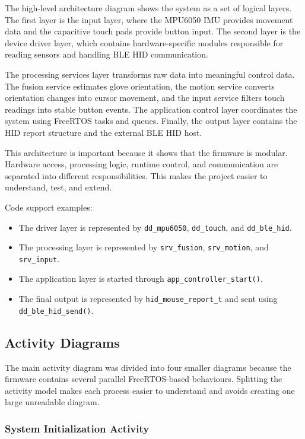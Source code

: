 The high-level architecture diagram shows the system as a set of logical layers. The first layer is the input layer, where the MPU6050 IMU provides movement data and the capacitive touch pads provide button input. The second layer is the device driver layer, which contains hardware-specific modules responsible for reading sensors and handling BLE HID communication.

The processing services layer transforms raw data into meaningful control data. The fusion service estimates glove orientation, the motion service converts orientation changes into cursor movement, and the input service filters touch readings into stable button events. The application control layer coordinates the system using FreeRTOS tasks and queues. Finally, the output layer contains the HID report structure and the external BLE HID host.

This architecture is important because it shows that the firmware is modular. Hardware access, processing logic, runtime control, and communication are separated into different responsibilities. This makes the project easier to understand, test, and extend.

Code support examples:
\begin{itemize}
    \item The driver layer is represented by \texttt{dd\_mpu6050}, \texttt{dd\_touch}, and \texttt{dd\_ble\_hid}.
    \item The processing layer is represented by \texttt{srv\_fusion}, \texttt{srv\_motion}, and \texttt{srv\_input}.
    \item The application layer is started through \texttt{app\_controller\_start()}.
    \item The final output is represented by \texttt{hid\_mouse\_report\_t} and sent using \texttt{dd\_ble\_hid\_send()}.
\end{itemize}

\subsection{Activity Diagrams}

The main activity diagram was divided into four smaller diagrams because the firmware contains several parallel FreeRTOS-based behaviours. Splitting the activity model makes each process easier to understand and avoids creating one large unreadable diagram.

\subsubsection{System Initialization Activity}

